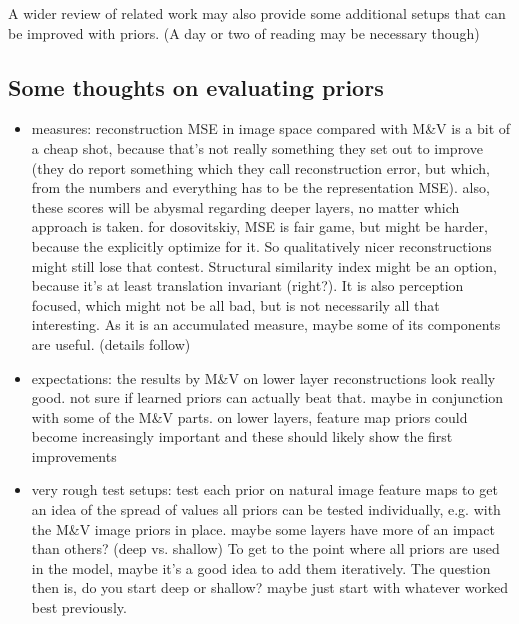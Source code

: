 \documentclass{article}
\begin{document}
A wider review of related work may also provide some additional setups that can be improved with priors. (A day or two of reading may be necessary though)

\subsection{Some thoughts on evaluating priors}

\begin{itemize}
	\item measures:
	\subitem reconstruction MSE in image space compared with M\&V is a bit of a cheap shot, because that's not really something they set out to improve (they do report something which they call reconstruction error, but which, from the numbers and everything has to be the representation MSE). also, these scores will be abysmal regarding deeper layers, no matter which approach is taken.
	\subitem for dosovitskiy, MSE is fair game, but might be harder, because the explicitly optimize for it. So qualitatively nicer reconstructions might still lose that contest.
	\subitem Structural similarity index might be an option, because it's at least translation invariant (right?). It is also perception focused, which might not be all bad, but is not necessarily all that interesting. As it is an accumulated measure, maybe some of its components are useful. (details follow)
	\item expectations:
	\subitem the results by M\&V on lower layer reconstructions look really good. not sure if learned priors can actually beat that. maybe in conjunction with some of the M\&V parts.
	\subitem on lower layers, feature map priors could become increasingly important and these should likely show the first improvements
	\item very rough test setups:
	\subitem test each prior on natural image feature maps to get an idea of the spread of values
	\subitem all priors can be tested individually, e.g. with the M\&V image priors in place. maybe some layers have more of an impact than others? (deep vs. shallow)
	\subitem To get to the point where all priors are used in the model, maybe it's a good idea to add them iteratively. The question then is, do you start deep or shallow? maybe just start with whatever worked best previously. 
	\subitem 
\end{itemize}
\end{document}
